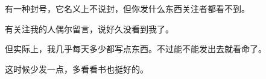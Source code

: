 \begin{zhihuanswer}
有一种封号，它名义上不说封，但你发什么东西关注者都看不到。

有关注我的人偶尔留言，说好久没看到我了。

但实际上，我几乎每天多少都写点东西。不过能不能发出去就看命了。

这时候少发一点，多看看书也挺好的。
\end{zhihuanswer}
